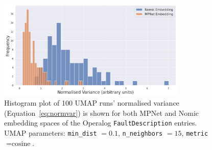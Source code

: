 \documentclass[10pt,oneside]{report}
\begin{document}
\begin{figure}[htbp]
\centering
\includegraphics[width=0.8\textwidth]{distUMAP.png}
\caption{Histogram plot of 100 UMAP runs' normalised variance (Equation~\ref{eq:normvar}) is shown for both MPNet and Nomic embedding spaces of the Operalog \texttt{FaultDescription} entries. UMAP parameters: \texttt{min\_dist} $=0.1$, \texttt{n\_neighbors} $=15$, \texttt{metric} $= \text{cosine}$.}
\label{fig:normvarumap}
\end{figure}
\end{document}
